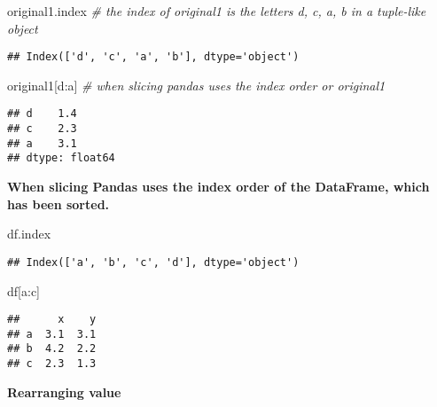 \documentclass[
]{book}
\newenvironment{Shaded}{\begin{snugshade}}{\end{snugshade}}
\newcommand{\CommentTok}[1]{\textcolor[rgb]{0.56,0.35,0.01}{\textit{#1}}}
\newcommand{\NormalTok}[1]{#1}
\newcommand{\StringTok}[1]{\textcolor[rgb]{0.31,0.60,0.02}{#1}}
\begin{document}
\begin{Shaded}
\begin{Highlighting}[]
\NormalTok{original1.index }\CommentTok{\# the index of original1 is the letters d, c, a, b in a tuple{-}like object}
\end{Highlighting}
\end{Shaded}

\begin{verbatim}
## Index(['d', 'c', 'a', 'b'], dtype='object')
\end{verbatim}

\begin{Shaded}
\begin{Highlighting}[]
\NormalTok{original1[}\StringTok{\textquotesingle{}d\textquotesingle{}}\NormalTok{:}\StringTok{\textquotesingle{}a\textquotesingle{}}\NormalTok{] }\CommentTok{\# when slicing pandas uses the index order or original1}
\end{Highlighting}
\end{Shaded}

\begin{verbatim}
## d    1.4
## c    2.3
## a    3.1
## dtype: float64
\end{verbatim}

{\textbf{When slicing Pandas uses the index order of the DataFrame, which has been sorted.}}

\begin{Shaded}
\begin{Highlighting}[]
\NormalTok{df.index }
\end{Highlighting}
\end{Shaded}

\begin{verbatim}
## Index(['a', 'b', 'c', 'd'], dtype='object')
\end{verbatim}

\begin{Shaded}
\begin{Highlighting}[]
\NormalTok{df[}\StringTok{\textquotesingle{}a\textquotesingle{}}\NormalTok{:}\StringTok{\textquotesingle{}c\textquotesingle{}}\NormalTok{]}
\end{Highlighting}
\end{Shaded}

\begin{verbatim}
##      x    y
## a  3.1  3.1
## b  4.2  2.2
## c  2.3  1.3
\end{verbatim}

\textbf{Rearranging value}
\end{document}
